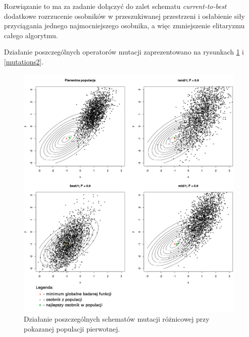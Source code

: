 \documentclass[12pt,a4paper]{report}
\begin{document}
{{{{\begin{description}
Rozwiązanie to ma za zadanie dołączyć do zalet schematu \emph{current-to-best} dodatkowe rozrzucenie osobników w przeszukiwanej przestrzeni i osłabienie siły przyciągania jednego najmocniejszego osobnika, a więc zmniejszenie elitaryzmu całego algorytmu.


\par{
Działanie poszczególnych operatorów mutacji zaprezentowano na rysunkach \ref{mutations1} i \ref{mutations2}.
}


\begin{figure}[h]
\begin{center}\includegraphics[scale=0.375]{img/mutations1.png}\end{center}
\caption{Działanie poszczególnych schematów mutacji różnicowej przy pokazanej populacji pierwotnej.}
\label{mutations1}
\end{figure}


\end{description}}}}}
\end{document}
